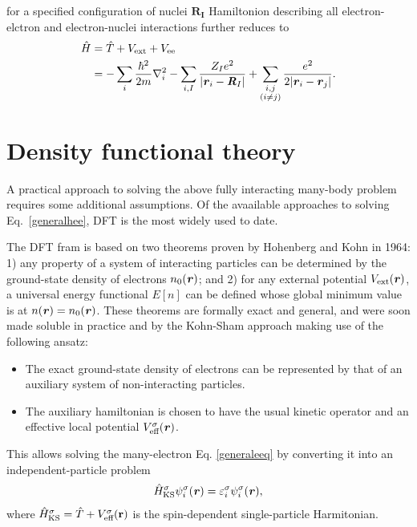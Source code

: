 %
for a specified configuration of nuclei $\mathbf{R_I}$ Hamiltonion describing all
electron-elctron and electron-nuclei interactions further reduces to
%
\begin{equation}\label{generalhee2}
\begin{aligned}
\hat{H}&=\hat{T}+V_\text{ext}+V_\text{ee} \\
&=-\sum_i\frac{\hbar^2}{2m}\nabla_i^2-
\sum_{i,I}\frac{Z_Ie^2}{|\textbf{\textit r}_i-\textbf{\textit R}_I|}+
\sum_{\substack{i,j\\(i\neq j)}}\frac{e^2}{2|\textbf{\textit r}_i-\textbf{\textit r}_j|}.
\end{aligned}
\end{equation}

\section{Density functional theory}\label{ksdft}

A practical approach to solving the above fully interacting many-body problem
requires some additional assumptions. Of the avaailable approaches to solving
Eq.~\ref{generalhee}, DFT is the most widely used to date. 

The DFT fram is based on two theorems proven by Hohenberg and Kohn \cite{Hohenberg1964} in
1964: 1) any property of a system of interacting particles can be determined by the
ground-state density of electrons $n_0(\textbf{\textit r})$; and 2) for any external
potential $V_\text{ext}(\textbf{\textit r})$, a universal energy functional $E[n]$
can be defined whose global minimum value is at $n(\textbf{\textit
r})=n_0(\textbf{\textit r})$. These theorems are formally exact and general, and were
soon made soluble in practice and by the Kohn-Sham approach \cite{Kohn1965} making use
of the following ansatz:
%
\begin{itemize}
\item The exact ground-state density of electrons can be represented by that of an auxiliary system of non-interacting particles.
\item The auxiliary hamiltonian is chosen to have the usual kinetic operator and an effective local potential $V_\text{eff}^\sigma(\textbf{\textit r})$.
\end{itemize}
This allows solving the many-electron Eq. \ref{generaleeq} by converting it into an independent-particle problem 
\begin{equation}\label{kseq}
\begin{aligned}
\hat{H}_\text{KS}^\sigma\psi_i^\sigma(\textbf{\textit r})=\varepsilon_i^\sigma\psi_i^\sigma(\textbf{\textit r}), 
\end{aligned}
\end{equation}
where $\hat{H}_\text{KS}^\sigma=\hat{T}+V_\text{eff}^\sigma(\textbf r)$ is the spin-dependent single-particle Harmitonian.

